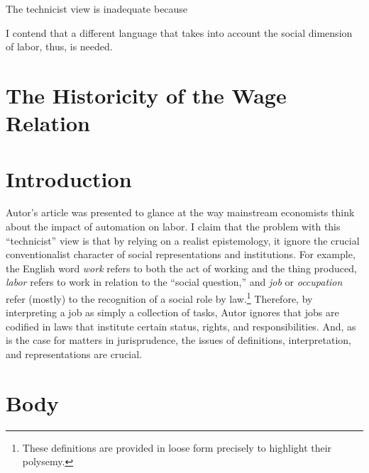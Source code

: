 \documentclass[version=last,draft=false,paper=A4,portrait,twoside=true,twocolumn=false,headinclude=false,footinclude=false,mpinclude=true,fontsize=12,BCOR=20mm,DIV=calc,pagesize=auto,open=right,chapterprefix=true,numbers=autoendperiod,headsepline=false,headings=twolinechapter,parskip=false]{scrbook}
\begin{document}
The technicist view is inadequate because

I contend that a different language that takes into account the social
dimension of labor, thus, is needed.


\section{The Historicity of the Wage Relation}
\label{sec:org32cd75d}
\section{Introduction}
\label{sec:orgc38a34e}

Autor's article was presented to glance at the way mainstream economists
think about the impact of automation on labor. I claim that the problem
with this ``technicist'' view is that by relying on a realist epistemology,
it ignore the crucial conventionalist character of social representations
and institutions. For example, the English word \emph{work} refers to both the act
of working and the thing produced, \emph{labor} refers to work in relation to the
``social question,'' and \emph{job} or \emph{occupation} refer (mostly) to the
recognition of a social role by law.\footnote{These definitions are provided in loose form precisely to highlight
their polysemy.} Therefore, by interpreting a job
as simply a collection of tasks, Autor ignores that jobs are codified in
laws that institute certain status, rights, and responsibilities. And, as
is the case for matters in jurisprudence, the issues of definitions,
interpretation, and representations are crucial.

\section{Body}
\label{sec:org861e9f9}
\end{document}
